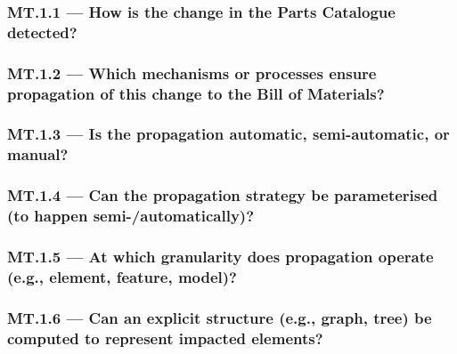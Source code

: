 \documentclass[sigconf]{acmart}
\begin{document}
\subsubsection*{MT.1.1 --- How is the change in the Parts Catalogue detected?}
\label{sec:MT1-1}



\subsubsection*{MT.1.2 --- Which mechanisms or processes ensure propagation of this change to the Bill of Materials?}
\label{sec:MT1-2}



\subsubsection*{MT.1.3 --- Is the propagation automatic, semi-automatic, or manual?}
\label{sec:MT1-3}



\subsubsection*{MT.1.4 --- Can the propagation strategy be parameterised (to happen semi-/automatically)?}
\label{sec:MT1-4}



\subsubsection*{MT.1.5 --- At which granularity does propagation operate (e.g., element, feature, model)?}
\label{sec:MT1-5}



\subsubsection*{MT.1.6 --- Can an explicit structure (e.g., graph, tree) be computed to represent impacted elements?}
\label{sec:MT1-6}

\end{document}
